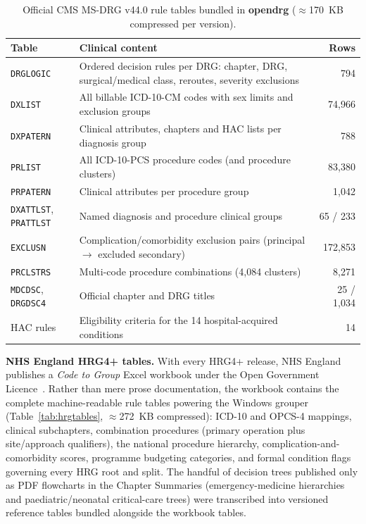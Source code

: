 \documentclass[fleqn,10pt]{IOMEDArticle}
\begin{document}
\begin{table}[!t]\centering
\caption{Official CMS MS-DRG v44.0 rule tables bundled in \textbf{opendrg} ($\approx$170~KB compressed per version).}
\label{tab:flatfiles}
\scriptsize
\setlength{\tabcolsep}{3.5pt}
\begin{tabular}{@{}p{2.05cm}p{4.55cm}r@{}}
\toprule
Table & Clinical content & Rows \\
\midrule
\texttt{DRGLOGIC} & Ordered decision rules per DRG: chapter, DRG, surgical/medical class, reroutes, severity exclusions & 794 \\
\texttt{DXLIST} & All billable ICD-10-CM codes with sex limits and exclusion groups & 74{,}966 \\
\texttt{DXPATERN} & Clinical attributes, chapters and HAC lists per diagnosis group & 788 \\
\texttt{PRLIST} & All ICD-10-PCS procedure codes (and procedure clusters) & 83{,}380 \\
\texttt{PRPATERN} & Clinical attributes per procedure group & 1{,}042 \\
\texttt{DXATTLST}, \texttt{PRATTLST} & Named diagnosis and procedure clinical groups & 65 / 233 \\
\texttt{EXCLUSN} & Complication/comorbidity exclusion pairs (principal $\rightarrow$ excluded secondary) & 172{,}853 \\
\texttt{PRCLSTRS} & Multi-code procedure combinations (4{,}084 clusters) & 8{,}271 \\
\texttt{MDCDSC}, \texttt{DRGDSC4} & Official chapter and DRG titles & 25 / 1{,}034 \\
HAC rules & Eligibility criteria for the 14 hospital-acquired conditions & 14 \\
\bottomrule
\end{tabular}
\end{table}

\textbf{NHS England HRG4+ tables.} With every HRG4+ release, NHS England publishes a \emph{Code to Group} Excel workbook under the Open Government Licence~\cite{nhse2025hrg,ogl3}. Rather than mere prose documentation, the workbook contains the complete machine-readable rule tables powering the Windows grouper (Table~\ref{tab:hrgtables}, $\approx$272~KB compressed): ICD-10 and OPCS-4 mappings, clinical subchapters, combination procedures (primary operation plus site/approach qualifiers), the national procedure hierarchy, complication-and-comorbidity scores, programme budgeting categories, and formal condition flags governing every HRG root and split. The handful of decision trees published only as PDF flowcharts in the Chapter Summaries (emergency-medicine hierarchies and paediatric/neonatal critical-care trees) were transcribed into versioned reference tables bundled alongside the workbook tables.
\end{document}
